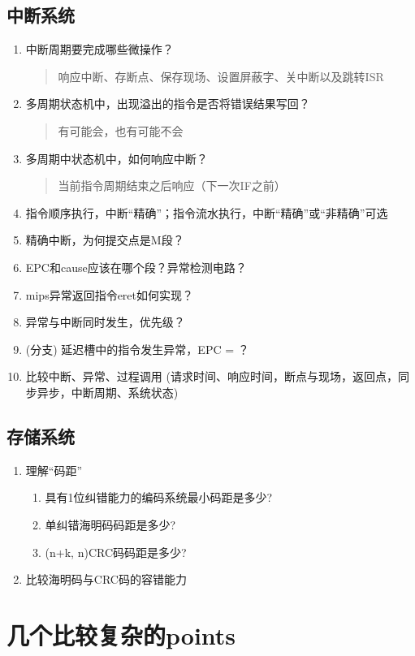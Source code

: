 \documentclass[]{report}
\begin{document}
	\subsection{中断系统}
		\begin{enumerate}
			\item 中断周期要完成哪些微操作？
			\begin{quote}
				响应中断、存断点、保存现场、设置屏蔽字、关中断以及跳转ISR
			\end{quote}
			\item 多周期状态机中，出现溢出的指令是否将错误结果写回？
			\begin{quote}
				有可能会，也有可能不会
			\end{quote}
			\item 多周期中状态机中，如何响应中断？
			\begin{quote}
				当前指令周期结束之后响应（下一次IF之前）
			\end{quote}
			\item 指令顺序执行，中断“精确”；指令流水执行，中断“精确”或“非精确”可选
			\item 精确中断，为何提交点是M段？
			\item EPC和cause应该在哪个段？异常检测电路？
			\item mips异常返回指令eret如何实现？
			\item 异常与中断同时发生，优先级？
			\item (分支) 延迟槽中的指令发生异常，EPC = ？
			\item 比较中断、异常、过程调用 (请求时间、响应时间，断点与现场，返回点，同步异步，中断周期、系统状态)
		\end{enumerate}
	\subsection{存储系统}
		\begin{enumerate}
			\item 理解“码距”
			\begin{enumerate}
				\item 具有1位纠错能力的编码系统最小码距是多少?
				\item 单纠错海明码码距是多少?
				\item (n+k, n)CRC码码距是多少?
			\end{enumerate}
			\item 比较海明码与CRC码的容错能力
		\end{enumerate}

	\section{几个比较复杂的points}
\end{document}

